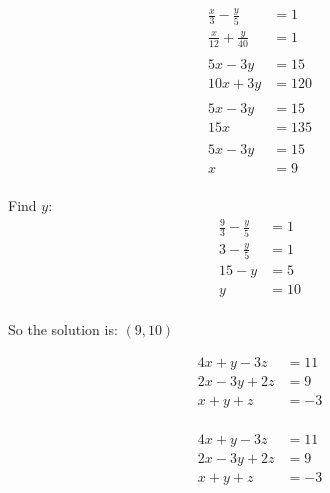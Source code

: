 \documentclass[fleqn,addpoints]{exam}
\begin{document}
\begin{questions}
\begin{solution}[6 cm]
\begin{align*}
  \frac{x}{3} - \frac{y}{5} &= 1 \\
  \frac{x}{12} + \frac{y}{40} &= 1 \\
  \\
  5x - 3y &= 15 \\
  10x + 3y &= 120 \\
  \\
  5x - 3y &= 15 \\
  15x &= 135 \\
  \\
  5x - 3y &= 15 \\
  x &= 9 \\
\end{align*}

Find $y$:
\begin{align*}
  \frac{9}{3} - \frac{y}{5} &= 1 \\
  3 - \frac{y}{5} &= 1 \\
  15 - y &= 5 \\
  y &= 10 \\
\end{align*}

So the solution is: $(9, 10)$
\end{solution}



\question[15] 
\label{system:last}
\begin{align*}
  4x + y -3z &= 11 \\
  2x - 3y + 2z &= 9 \\
  x + y + z &= -3 \\
\end{align*}

\begin{solution}[8 cm]
\begin{align*}
  4x + y -3z &= 11 \\
  2x - 3y + 2z &= 9 \\
  x + y + z &= -3 \\
\end{align*}


\end{solution}
\end{questions}
\end{document}

